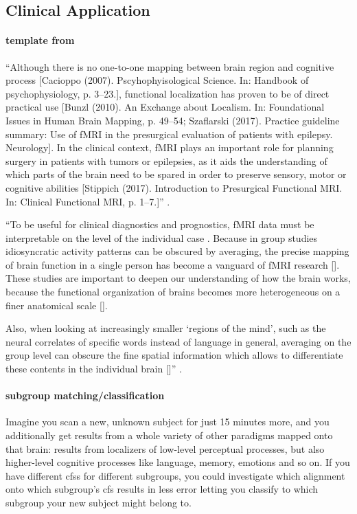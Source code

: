 \subsection{Clinical Application}



\paragraph{template from \citet{wegrzyn2018thought}}

``Although there is no one-to-one mapping between brain region and cognitive
process [Cacioppo (2007). Pscyhophyisological Science. In: Handbook of
psychophysiology, p. 3–23.], functional localization has proven to be of direct
practical use [Bunzl (2010). An Exchange about Localism. In: Foundational Issues
in Human Brain Mapping, p. 49–54; Szaflarski (2017). Practice guideline summary:
Use of fMRI in the presurgical evaluation of patients with epilepsy. Neurology].
%
In the clinical context, fMRI plays an important role for planning surgery in
patients with tumors or epilepsies, as it aids the understanding of which parts
of the brain need to be spared in order to preserve sensory, motor or cognitive
abilities [Stippich (2017). Introduction to Presurgical Functional MRI. In:
Clinical Functional MRI, p. 1–7.]'' \citep{wegrzyn2018thought}.

``To be useful for clinical diagnostics and prognostics, fMRI data must be
interpretable on the level of the individual case \citep{dubois2016building}.
%
Because in group studies idiosyncratic activity patterns can be obscured by
averaging, the precise mapping of brain function in a single person has become a
vanguard of fMRI research [\citet{laumann2015functional, huth2016natural,
gordon2017precision}].
%
These studies are important to deepen our understanding of how the brain works,
because the functional organization of brains becomes more heterogeneous on a
finer anatomical scale [\citet{laumann2015functional, poldrack2017precision}].

%
Also, when looking at increasingly smaller ‘regions of the mind’, such as the
neural correlates of specific words instead of language in general, averaging on
the group level can obscure the fine spatial information which allows to
differentiate these contents in the individual brain [\citet{huth2016natural}]''
\citep{wegrzyn2018thought}.


\paragraph{subgroup matching/classification}
%
Imagine you scan a new, unknown subject for just 15 minutes more, and you
additionally get results from a whole variety of other paradigms mapped onto
that brain: results from localizers of low-level perceptual processes, but also
higher-level cognitive processes like language, memory, emotions and so on.
%
If you have different \acp{cfs} for different subgroups, you could investigate
which alignment onto which subgroup's \ac{cfs} results in less
error letting you classify to which subgroup your new subject might belong to.



